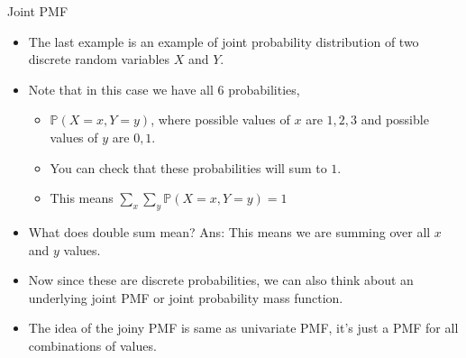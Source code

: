 \documentclass[8pt, usepdftitle = false]{beamer}
\begin{document}
\begin{frame}{Joint PMF}



\begin{itemize}

 \item The last example is an example of \alert{joint probability distribution} of two discrete random variables $X$ and $Y$.

 \item Note that in this case we have all $6$ probabilities,

 \begin{itemize}
   \item $\mathbb{P}(X = x, Y = y)$, where possible values of $x$ are $1, 2, 3$ and possible values of $y$ are $0, 1$.

   \item You can check that these probabilities will sum to $1$.

   \item This means $  \sum_x \sum_y \mathbb{P}(X = x, Y = y)=1$
 \end{itemize}

 \item What does double sum mean? Ans: This means we are summing over all $x$ and $y$ values.

 \item Now since these are discrete probabilities, we can also think about an underlying joint PMF or \alert{joint probability mass function}.

 \item The idea of the joiny PMF is same as univariate PMF, it's just a PMF for all combinations of values.



\end{itemize}


\end{frame}
\end{document}
